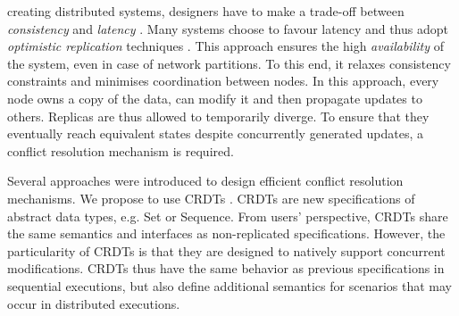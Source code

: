 \documentclass[10pt,journal,compsoc]{IEEEtran}
\begin{document}
%
\IEEEpeerreviewmaketitle

%
%
%
%
 creating distributed systems, designers have to make a trade-off between \emph{consistency} and \emph{latency} \cite{pacelc2012}.
Many systems choose to favour latency and thus adopt \emph{optimistic replication} techniques \cite{10.1145/1057977.1057980}.
This approach ensures the high \emph{availability} of the system, even in case of network partitions.
To this end, it relaxes consistency constraints and minimises coordination between nodes.
In this approach, every node owns a copy of the data, can modify it and then propagate updates to others.
Replicas are thus allowed to temporarily diverge.
To ensure that they eventually reach equivalent states despite concurrently generated updates, a conflict resolution mechanism is required.

Several approaches were introduced to design efficient conflict resolution mechanisms.
We propose to use \acfp{CRDT} \cite{shapiro_2011_crdt}.
\acp{CRDT} are new specifications of abstract data types, e.g. Set or Sequence.
From users' perspective, \acp{CRDT} share the same semantics and interfaces as non-replicated specifications.
However, the particularity of \acp{CRDT} is that they are designed to natively support concurrent modifications.
\acp{CRDT} thus have the same behavior as previous specifications in sequential executions, but also define additional semantics for scenarios that may occur in distributed executions.
\end{document}
